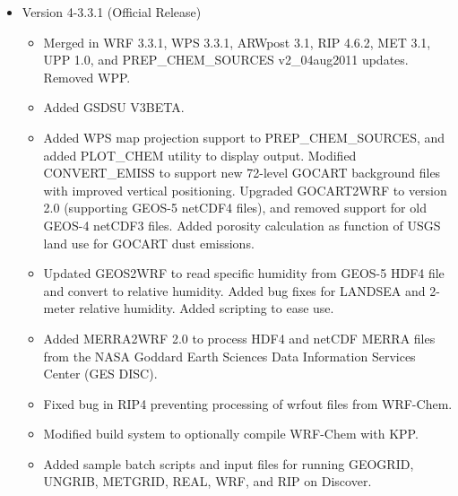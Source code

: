\begin{itemize}
\item Version 4-3.3.1 (Official Release)
  \begin{itemize}
  \item Merged in WRF 3.3.1, WPS 3.3.1, ARWpost 3.1, RIP 4.6.2, MET 3.1,
    UPP 1.0, and PREP\_CHEM\_SOURCES v2\_04aug2011 updates. Removed WPP.
  \item Added GSDSU V3BETA.
  \item Added WPS map projection support to PREP\_CHEM\_SOURCES, and added
    PLOT\_CHEM utility to display output. Modified CONVERT\_EMISS to support
    new 72-level GOCART background files with improved vertical positioning.
    Upgraded GOCART2WRF to version 2.0 (supporting GEOS-5 netCDF4 files), and
    removed support for old GEOS-4 netCDF3 files. Added porosity calculation
    as function of USGS land use for GOCART dust emissions.
  \item Updated GEOS2WRF to read specific humidity from GEOS-5 HDF4 file and
    convert to relative humidity. Added bug fixes for LANDSEA and 2-meter
    relative humidity. Added scripting to ease use.
  \item Added MERRA2WRF 2.0 to process HDF4 and netCDF MERRA files from
    the NASA Goddard Earth Sciences Data Information Services Center
    (GES DISC).
  \item Fixed bug in RIP4 preventing processing of wrfout files from WRF-Chem.
  \item Modified build system to optionally compile WRF-Chem with KPP.
  \item Added sample batch scripts and input files for running GEOGRID, UNGRIB,
    METGRID, REAL, WRF, and RIP on Discover.
  \end{itemize}


\end{itemize}
